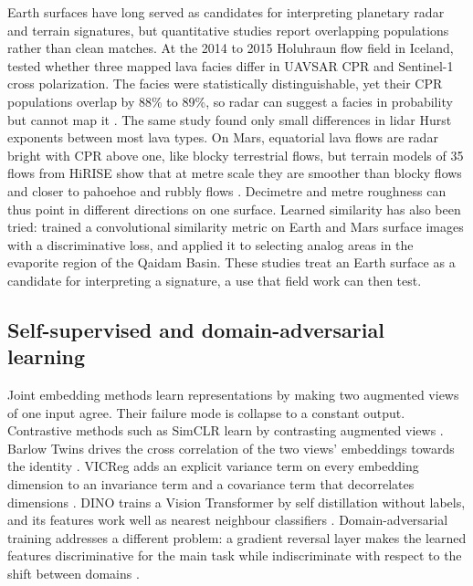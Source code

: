 Earth surfaces have long served as candidates for interpreting planetary radar and terrain
signatures, but quantitative studies report overlapping populations rather than clean matches. At
the 2014 to 2015 Holuhraun flow field in Iceland, \citet{tolometti2022holuhraun} tested whether
three mapped lava facies differ in UAVSAR CPR and Sentinel-1 cross polarization. The facies were
statistically distinguishable, yet their CPR populations overlap by 88\% to 89\%, so radar can
suggest a facies in probability but cannot map it \citep{tolometti2022holuhraun}. The same study
found only small differences in lidar Hurst exponents between most lava types. On Mars, equatorial
lava flows are radar bright with CPR above one, like blocky terrestrial flows, but terrain models
of 35 flows from HiRISE show that at metre scale they are smoother than blocky flows and closer to
pahoehoe and rubbly flows \citep{rodriguezsanchezvahamonde2021}. Decimetre and metre roughness can
thus point in different directions on one surface. Learned similarity has also been tried:
\citet{meng2024} trained a convolutional similarity metric on Earth and Mars surface images with a discriminative loss, and applied it to selecting analog areas in the evaporite region of the Qaidam Basin. These studies treat an Earth surface as a candidate for
interpreting a signature, a use that field work can then test.

\subsection{Self-supervised and domain-adversarial learning}

Joint embedding methods learn representations by making two augmented views of one input agree.
Their failure mode is collapse to a constant output. Contrastive methods such as SimCLR learn by
contrasting augmented views \citep{chen2020}. Barlow Twins drives the cross
correlation of the two views' embeddings towards the identity \citep{zbontar2021}. VICReg adds an
explicit variance term on every embedding dimension to an invariance term and a covariance term
that decorrelates dimensions \citep{bardes2021}. DINO trains a Vision
Transformer by self distillation without labels, and its features work well as nearest neighbour
classifiers \citep{caron2021}. Domain-adversarial training addresses a
different problem: a gradient reversal layer makes the learned features discriminative for the main task while indiscriminate with respect to the shift between domains \citep{ganin2015}.

